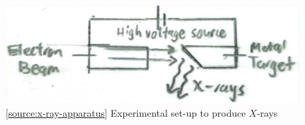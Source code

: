 \documentclass[oneside]{book}
\begin{document}
\begin{minipage}{0.4\textwidth}
    \begin{figure}[H]
        \centering
        \includegraphics[width=\textwidth,angle=90]{../images/x-ray-apparatus.pdf}
        \caption{\ref{source:x-ray-apparatus} Experimental set-up to produce \(X\)-rays}
        \label{fig:x-ray-apparatus}
    \end{figure} 
\end{minipage}
\end{document}

